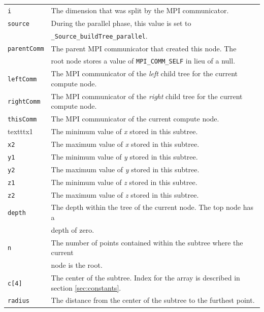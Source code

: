\documentclass{article}
\begin{document}
\begin{tabular}{l l}
\texttt{i} & The dimension that was split by the MPI communicator.  \\
\texttt{source} & During the parallel phase, this value is set to  \\
& \texttt{\_Source\_buildTree\_parallel}.  \\
\texttt{parentComm} & The parent MPI communicator that created this node. The\\
&  root node stores a value of \texttt{MPI\_COMM\_SELF} in lieu of a null. \\
\texttt{leftComm} & The MPI communicator of the \textit{left} child tree for the current compute node.  \\
\texttt{rightComm} & The MPI communicator of the \textit{right} child tree for the current compute node.  \\
\texttt{thisComm} & The MPI communicator of the current compute node.  \\
texttt{x1} & The minimum value of \textit{x} stored in this subtree.  \\
\texttt{x2} & The maximum value of \textit{x} stored in this subtree.  \\
\texttt{y1} & The minimum value of \textit{y} stored in this subtree.  \\
\texttt{y2} & The maximum value of \textit{y} stored in this subtree.  \\
\texttt{z1} & The minimum value of \textit{z} stored in this subtree.  \\
\texttt{z2} & The maximum value of \textit{z} stored in this subtree.  \\
\texttt{depth} & The depth within the tree of the current node. The top node has a \\
& depth of zero.  \\
\texttt{n} & The number of points contained within the subtree where the current \\
& node is the root.  \\
\texttt{c[4]} & The center of the subtree. Index for the array is described in section \ref{sec:constants}. \\
\texttt{radius} & The distance from the center of the subtree to the furthest point.  \\
\end{tabular} \\
\end{document}
